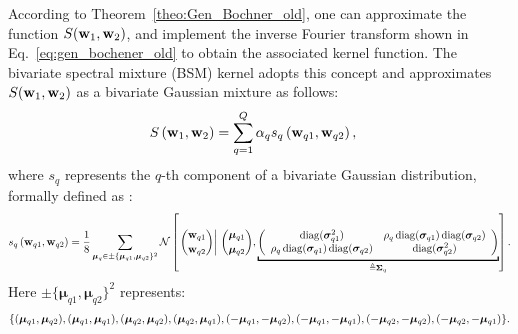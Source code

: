According to Theorem~\ref{theo:Gen_Bochner_old}, one can approximate the function $S({\mathbf w}_1, {\mathbf w}_2)$, and implement the inverse Fourier transform shown in Eq.~\eqref{eq:gen_bochener_old} to obtain the associated kernel function. The bivariate spectral mixture (\MakeUppercase{bsm}) kernel adopts this concept and approximates $S({\mathbf w}_1, {\mathbf w}_2)$ as a bivariate Gaussian mixture as follows:
\begin{equation}
\label{eq:spectral of BSM kernel}
\begin{aligned}
&S\left({\mathbf w}_1, {\mathbf w}_2\right) = \sum_{q=1}^Q \alpha_q s_q\left({\mathbf w}_{q1}, {\mathbf w}_{q2}\right), 
\end{aligned}
\end{equation}
where $s_q$ represents the $q$-th component of a bivariate Gaussian distribution, formally defined as \citep{remes2017non}:
\begin{equation}
\begin{aligned}
s_q\left(\w_{q1}, \w_{q2}\right) = \frac{1}{8}\sum_{\boldsymbol{\mu}_q \in \pm \{\boldsymbol{\mu}_{q1}, \boldsymbol{\mu}_{q2}\}^2}   \mathcal{N} \left[ \left.\binom{\w_{q1}}{\w_{q2}} \right\rvert\,\binom{\boldsymbol{\mu}_{q1}}{\boldsymbol{\mu}_{q2}}, \underbracket{\left(\begin{array}{cc}
\operatorname{diag}(\bm{\sigma}_{q1}^2) & \rho_q \operatorname{diag}(\bm{\sigma}_{q1})\operatorname{diag}(\bm{\sigma}_{q2})  \\
\rho_q \operatorname{diag}(\bm{\sigma}_{q1})\operatorname{diag}(\bm{\sigma}_{q2})  & \operatorname{diag}(\bm{\sigma}_{q2}^2)
\end{array}\right)}_{\triangleq \bm{\Sigma}_q} \right].
\end{aligned}
\end{equation}
Here $\pm \{\boldsymbol{\mu}_{q1}, \boldsymbol{\mu}_{q2}\}^2$ represents:
\begin{align}
\{ (\boldsymbol{\mu}_{q1}, \boldsymbol{\mu}_{q2}), (\boldsymbol{\mu}_{q1}, \boldsymbol{\mu}_{q1}), (\boldsymbol{\mu}_{q2}, \boldsymbol{\mu}_{q2}), (\boldsymbol{\mu}_{q2}, \boldsymbol{\mu}_{q1}), \notag (-\boldsymbol{\mu}_{q1}, -\boldsymbol{\mu}_{q2}), (-\boldsymbol{\mu}_{q1}, -\boldsymbol{\mu}_{q1}), (-\boldsymbol{\mu}_{q2}, -\boldsymbol{\mu}_{q2}), (-\boldsymbol{\mu}_{q2}, -\boldsymbol{\mu}_{q1})\}.
\end{align}


